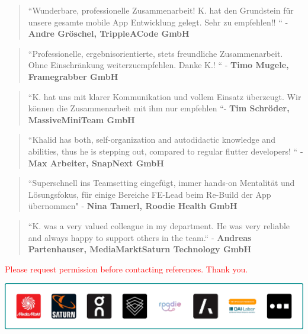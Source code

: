 \documentclass[10pt,a4paper,normalphoto]{altacv}
\begin{document}
\begin{fullwidth}
\newpage

\begin{quote}
``Wunderbare, professionelle Zusammenarbeit! K. hat den Grundstein für unsere gesamte mobile App Entwicklung gelegt. Sehr zu empfehlen!! `` - \textbf{Andre Gröschel, TrippleACode GmbH}\\
\end{quote}
\vspace{.5em}
\begin{quote}
``Professionelle, ergebnisorientierte, stets freundliche Zusammenarbeit. Ohne Einschränkung weiterzuempfehlen. Danke K.! `` - \textbf{Timo Mugele, Framegrabber GmbH}\\
\end{quote}

\vspace{.5em}

\begin{quote}
``K. hat uns mit klarer Kommunikation und vollem Einsatz überzeugt. Wir können die Zusammenarbeit mit ihm nur empfehlen ``- \textbf{Tim Schröder, MassiveMiniTeam GmbH}\\
\end{quote}

\vspace{.5em}
\begin{quote}
``Khalid has both, self-organization and autodidactic knowledge and abilities, thus he is stepping out, compared to regular flutter developers! `` - \textbf{Max Arbeiter, SnapNext GmbH}\\
\end{quote}

\vspace{.5em}    
\begin{quote}
``Superschnell ins Teamsetting eingefügt, immer hands-on Mentalität und Lösungsfokus, für einige Bereiche FE-Lead beim Re-Build der App übernommen" - \textbf{Nina Tamerl, Roodie Health GmbH}\\
\end{quote}

\vspace{.5em}
\begin{quote}
``K. was a very valued colleague in my department. He was very reliable and always happy to support others in the team.`` - \textbf{Andreas Partenhauser, MediaMarktSaturn Technology GmbH}\\
\end{quote}

\vspace{.5em}
\textcolor{red}{\small Please request permission before contacting references. Thank you.}
\end{fullwidth}

\begin{center}
  \includegraphics[width=0.905\paperwidth]{company-logos-outline.png}
\end{center}
\end{document}
